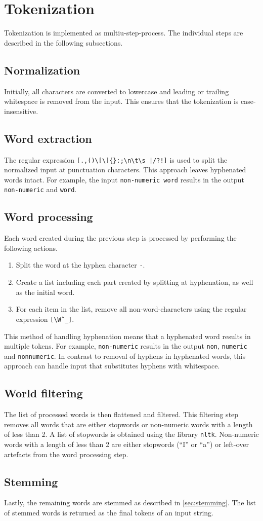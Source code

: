 \section{Tokenization}
\label{sec:tokenization}

Tokenization is implemented as multiu-step-process.
The individual steps are described in the following subsections.

\subsection{Normalization}
Initially, all characters are converted to lowercase and leading or trailing whitespace is removed from the input.
This ensures that the tokenization is case-insensitive.

\subsection{Word extraction}
The regular expression \verb=[.,()\[\]{}:;\n\t\s |/?!]= is used to split the normalized input at punctuation characters.
This approach leaves hyphenated words intact.
For example, the input \verb|non-numeric word| results in the output \verb|non-numeric| and \verb|word|.

\subsection{Word processing}
Each word created during the previous step is processed by performing the following actions.

\begin{enumerate}
  \item Split the word at the hyphen character \verb|-|.
  \item Create a list including each part created by splitting at hyphenation, as well as the initial word.
  \item For each item in the list, remove all non-word-characters using the regular expression \verb|[\Wˆ_]|.
\end{enumerate}

This method of handling hyphenation means that a hyphenated word results in multiple tokens.
For example, \verb|non-numeric| results in the output \verb|non|, \verb|numeric| and \verb|nonnumeric|.
In contrast to removal of hyphens in hyphenated words, this approach can handle input that substitutes hyphens with whitespace.

\subsection{World filtering}
The list of processed words is then flattened and filtered.
This filtering step removes all words that are either stopwords or non-numeric words with a length of less than 2.
A list of stopwords is obtained using the library \verb|nltk|.
Non-numeric words with a length of less than 2 are either stopwords (\enquote{I} or \enquote{a}) or left-over artefacts from the word processing step.

\subsection{Stemming}
Lastly, the remaining words are stemmed as described in \cref{sec:stemming}.
The list of stemmed words is returned as the final tokens of an input string.
